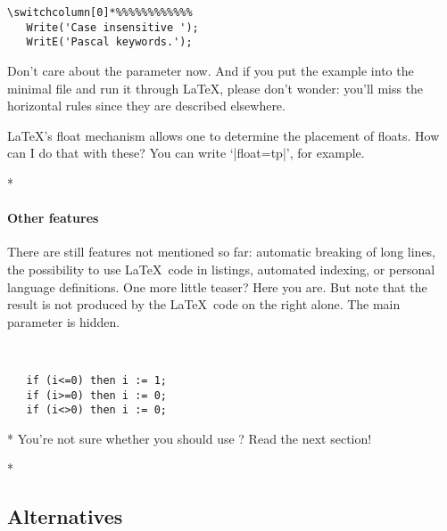 \begin{paracol}{2}
\begin{paracol}{2}
{\begin{lstsample}{\lstset{frame=tb}}{}
\begin{lstlisting}[float,caption=A floating example]
\switchcolumn[0]*%%%%%%%%%%%%
   Write('Case insensitive ');
   WritE('Pascal keywords.');
   \end{lstlisting}
\end{lstsample}
Don't care about the parameter  now. And if you put the
example into the minimal file and run it through \LaTeX, please don't wonder:
you'll miss the horizontal rules since they are described elsewhere.
\begin{advise}
\item \LaTeX's float mechanism allows one to determine the placement of floats.
      How can I do that with these?
      \advisespace
      You can write `|float=tp|', for example.
\end{advise}
\switchcolumn

\switchcolumn[0]*%
\paragraph{Other features}
There are still features not mentioned so far: automatic breaking of long
lines, the possibility to use \LaTeX\ code in listings, automated indexing,
or personal language definitions.
One more little teaser? Here you are. But note that the result is not
produced by the \LaTeX\ code on the right alone. The main parameter is
hidden.
\begin{lstsample}{^^A
  }{}
   \begin{lstlisting}
   if (i<=0) then i := 1;
   if (i>=0) then i := 0;
   if (i<>0) then i := 0;
   \end{lstlisting}
\end{lstsample}
\switchcolumn

\switchcolumn[0]*%
You're not sure whether you should use ?
Read the next section!
\switchcolumn

\switchcolumn[0]*%
\subsection{Alternatives}
\switchcolumn

}
\end{paracol}
\end{paracol}
